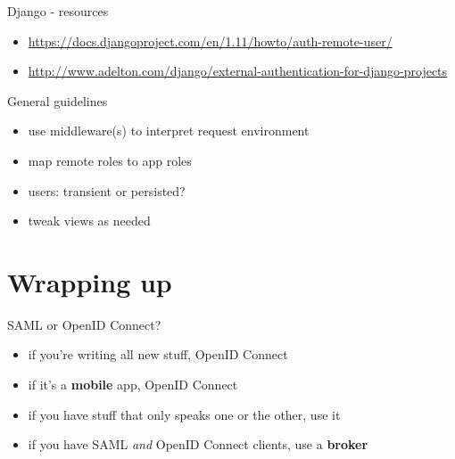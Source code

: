 \documentclass[ignorenonframetext,aspectratio=169]{beamer}
\providecommand{\tightlist}{%
  \setlength{\itemsep}{0pt}\setlength{\parskip}{0pt}}
\begin{document}
\begin{frame}{Django - resources}
\begin{itemize}
\tightlist

\item \url{https://docs.djangoproject.com/en/1.11/howto/auth-remote-user/}
\item \url{http://www.adelton.com/django/external-authentication-for-django-projects}

\end{itemize}
\end{frame}

\begin{frame}{General guidelines}
\begin{itemize}
\tightlist
\item use middleware(s) to interpret request environment
\item map remote roles to app roles
\item users: transient or persisted?
\item tweak views as needed
\end{itemize}
\end{frame}

\section{Wrapping up}

\begin{frame}{SAML or OpenID Connect?}
\begin{itemize}
\tightlist
\item if you're writing all new stuff, OpenID Connect
\item if it's a {\bf mobile} app, OpenID Connect
\item if you have stuff that only speaks one or the other, use it
\item if you have SAML {\em and} OpenID Connect clients, use a {\bf broker}
\end{itemize}
\end{frame}
\end{document}
